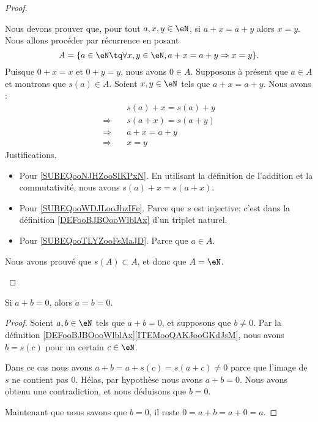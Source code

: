 \begin{proof}
\begin{subproof}
		\spitem[Régularité]
		Nous devons prouver que, pour tout \( a,x,y\in \eN\), si \( a+x=a+y\) alors \( x=y\). Nous allons procéder par récurrence en posant
		\begin{equation}
			A=\{ a\in \eN\tq\forall x,y\in \eN, a+x=a+y\Rightarrow x=y\}.
		\end{equation}
		Puisque \( 0+x=x\) et \( 0+y=y\), nous avons \( 0\in A\). Supposons à présent que \( a\in A\) et montrons que \( s(a)\in A\). Soient \( x,y\in \eN\) tels que \( a+x=a+y\). Nous avons :
		\begin{subequations}
			\begin{align}
				            & \quad s(a)+x=s(a)+y                                \\
				\Rightarrow & \quad s(a+x)=s(a+y)    \label{SUBEQooNJHZooSIKPxN} \\
				\Rightarrow & \quad a+x=a+y          \label{SUBEQooWDJLooJhzIFe} \\
				\Rightarrow & \quad x=y              \label{SUBEQooTLYZooFsMaJD}
			\end{align}
		\end{subequations}
		Justifications.
		\begin{itemize}
			\item Pour \eqref{SUBEQooNJHZooSIKPxN}. En utilisant la définition de l'addition et la commutativité, nous avons \( s(a)+x=s(a+x)\).
			\item Pour \eqref{SUBEQooWDJLooJhzIFe}. Parce que \( s\) est injective; c'est dans la définition \ref{DEFooBJBOooWlblAx} d'un triplet naturel.
			\item Pour \eqref{SUBEQooTLYZooFsMaJD}. Parce que \( a\in A\).
		\end{itemize}
		Nous avons prouvé que \( s(A)\subset A\), et donc que \( A=\eN\).
	\end{subproof}
\end{proof}

\begin{lemma}       \label{LEMooQBHFooCuCusQ}
	Si \( a+b=0\), alors \( a=b=0\).
\end{lemma}

\begin{proof}
	Soient \( a,b\in \eN\) tels que \( a+b=0\), et supposons que \( b\neq 0\). Par la définition \ref{DEFooBJBOooWlblAx}\ref{ITEMooQAKJooGKdJsM}, nous avons \( b=s(c)\) pour un certain \( c\in \eN\).

	Dans ce cas nous avons \( a+b=a+s(c)=s(a+c)\neq 0\) parce que l'image de \( s\) ne contient pas \( 0\). Hélas, par hypothèse nous avons \( a+b=0\). Nous avons obtenu une contradiction, et nous déduisons que \( b=0\).

	Maintenant que nous savons que \( b=0\), il reste \( 0=a+b=a+0=a\).
\end{proof}

